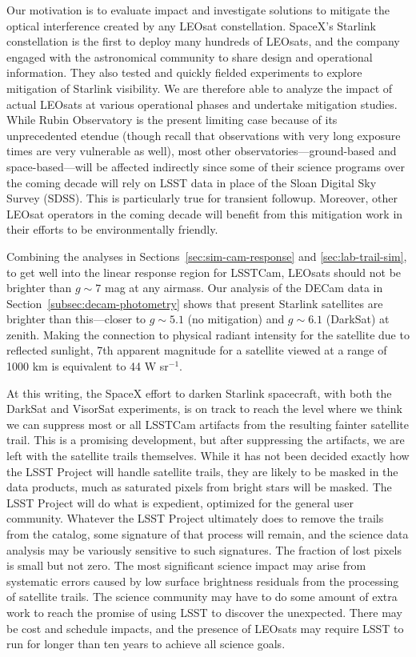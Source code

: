 \documentclass[twocolumn,trackchanges]{aastex63}
\begin{document}
Our motivation is to evaluate impact and investigate solutions to mitigate the optical interference created by any LEOsat constellation. SpaceX's Starlink constellation is the first to deploy many hundreds of LEOsats, and the company engaged with the astronomical community to share design and operational information. They also tested and quickly fielded experiments to explore mitigation of Starlink visibility. We are therefore able to analyze the impact of actual LEOsats at various operational phases and undertake mitigation studies. While Rubin Observatory is the present limiting case because of its unprecedented etendue (though recall that observations with very long exposure times are very vulnerable as well), most other observatories---ground-based and space-based---{will be affected indirectly since some of their science programs over the coming decade will rely on LSST data in place of the Sloan Digital Sky Survey (SDSS). This is particularly true for transient followup.} Moreover, other LEOsat operators in the coming decade will benefit from this mitigation work in their efforts to be environmentally friendly.

Combining the analyses in Sections~\ref{sec:sim-cam-response} and \ref{sec:lab-trail-sim}, to get well into the linear response region for LSSTCam, LEOsats should not be brighter than $g\sim7$ mag at any airmass. Our analysis of the DECam data in Section~\ref{subsec:decam-photometry} shows that present Starlink satellites are brighter than this---closer to $g\sim5.1$ (no mitigation) and $g\sim6.1$ (DarkSat) at zenith.
Making the connection to physical radiant intensity for the satellite due to reflected sunlight, 7th apparent magnitude for a satellite viewed at a range of 1000 km is equivalent to 44 W sr$^{-1}$.

At this writing, the SpaceX effort to darken Starlink spacecraft, with both the DarkSat and VisorSat experiments, is on track to reach the level where we think we can suppress most or all LSSTCam artifacts from the resulting fainter satellite trail.
This is a promising development, but after suppressing the artifacts, we are left with the satellite trails themselves. While it has not been decided exactly how the LSST Project will handle satellite trails, they are likely to be masked in the data products, much as saturated pixels from bright stars will be masked. The LSST Project will do what is expedient, optimized for the general user community. Whatever the LSST Project ultimately does to remove the trails from the catalog, some signature of that process will remain, and the science data analysis may be variously sensitive to such signatures. The fraction of lost pixels is small but not zero. The most significant science impact may arise from systematic errors caused by low surface brightness residuals from the processing of satellite trails. The science community may have to do some amount of extra work to reach the promise of using LSST to discover the unexpected. There may be cost and schedule impacts, and the presence of LEOsats may require LSST to run for longer than ten years to achieve all science goals.
\end{document}
